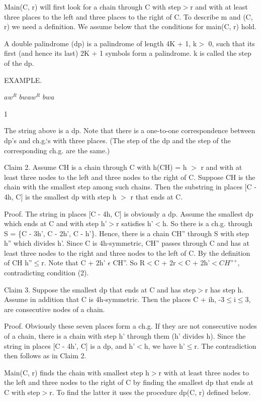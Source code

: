 \documentclass[11pt,a4paper]{report}
\begin{document}
Main(C, r) will first look for a chain through C with step$ >$r and with at least three
places to the left and three places to the right of C. To describe m and (C, r) we need a
definition. We assume below that the conditions for main(C, r) hold.

A double palindrome (dp) is a palindrome of length 4K + 1, k$ >$ 0, such that its first
(and hence its last) 2K + 1 symbols form a palindrome. k is called the step of the dp.

EXAMPLE.
\begin{center}
    $aw^R$ $bwaw^R$ $bwa$

    1 
\end{center}


The string above is a dp. Note that there is a one-to-one correspondence between dp’s
and ch.g.‘s with three places. (The step of the dp and the step of the corresponding ch.g.
are the same.)

Claim 2. Assume CH is a chain through C with h(CH) = h $>$ r and with at least
three nodes to the left and three nodes to the right of C. Suppose CH is the chain with 
the smallest step among such chains. Then the substring in places [C - 4h, C] is the smallest
dp with step h $>$ r that ends at C.

Proof. The string in places [C - 4h, C] is obviously a dp. Assume the smallest dp
which ends at C and with step h’$>$r satisfies h’$<$h. So there is a ch.g. through S =
\{C - 3h’, C - 2h’, C - h’\}. Hence, there is a chain CH” through S with step h” which
divides h’. Since C is 4h-symmetric, CH” passes through C and has at least three nodes
to the right and three nodes to the left of C. By the definition of CH h”$\leq$r. Note that
C + 2h’ $\epsilon$ CH”. So R$<$C + 2r$<$C + 2h’$<CH”^+$, contradicting condition (2). 

Claim 3. Suppose the smallest dp that ends at C and has step$>$r has step h. Assume
in addition that C is 4h-symmetric. Then the places C + ih, -3$\leq$i$\leq$3, are consecutive
nodes of a chain.

Proof. Obviously these seven places form a ch.g. If they are not consecutive nodes
of a chain, there is a chain with step h’ through them (h’ divides h). Since the string in
places [C - 4h’, C] is a dp, and h’$<$h, we have h’$\leq$r. The contradiction then follows
as in Claim 2. 

Main(C, r) finds the chain with smallest step h$>$r with at least three nodes to the left
and three nodes to the right of C by finding the smallest dp that ends at C with step$>$r.
To find the latter it uses the procedure dp(C, r) defined below.
\end{document}
